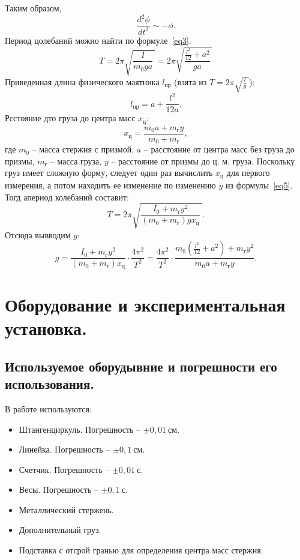 \documentclass[a4paper,11pt]{article}
\begin{document}
Таким образом,
$$\frac{d^{2}\phi}{dt^{2}} \sim - \phi.$$
Период цолебаний можно найти по формуле~\ref{eq3}.
\begin{equation}    \label{eq3}
  T = 2 \pi \sqrt{\frac{I}{m_{0}ga}\ } = 2 \pi \sqrt{\frac{\frac{l^{2}}{12} + a^{2}}{ga}\ }
\end{equation}
Приведенная длина физического маятника $l_{пр}$ (взята из $T = 2 \pi \sqrt{\frac{l}{g}\ }$):
\begin{equation}    \label{eq4}
  l_{пр} = a + \frac{l^{2}}{12a}.
\end{equation}
Рсстояние дто груза до центра масс $x_{ц}$:
\begin{equation}    \label{eq5}
  x_{ц} = \frac{m_{0}a + m_{г}y}{m_{0} + m_{г}},
\end{equation}
где $m_{0}$ -- масса стержня с призмой, $a$ -- расстояние от центра масс без груза до призмы, $m_{г}$ -- масса груза, $y$ -- расстояние от призмы до ц. м. груза.\newline
Поскольку груз имеет сложную форму, следует один раз вычислить $x_{ц}$ для первого измерения, а потом находить ее изменение по изменению $y$ из формулы~\ref{eq5}. Тогд апериод колебаний составит:
\begin{equation}    \label{eq6}
  T = 2 \pi \sqrt{\frac{I_{0} + m_{г} y^{2}}{(m_{0} + m_{г}) g x_{ц}}\ }.
\end{equation}
Отсюда вывводим $g$:
\begin{equation}    \label{eq7}
  g = \frac{I_{0} + m_{г}y^{2}}{(m_{0} + m_{г}) x_{ц}} \cdot \frac{4 \pi^{2}}{T^{2}} = \frac{4 \pi^{2}}{T^{2}} \cdot \frac{m_{0}(\frac{l^{2}}{12} + a^{2}) + m_{г} y^{2}}{m_{0}a + m_{г}y}.
\end{equation}
\section{Оборудование и экспериментальная установка.}
\subsection{Используемое оборудывние и погрешности его использования.}
В работе используются:
\begin{itemize}
        \item Штангенциркуль. Погрешность -- $\pm 0,01\ см$.
        \item Линейка. Погрешность -- $\pm 0,1\ см$.
        \item Счетчик. Погрешность -- $\pm 0,01\ с$.
        \item Весы. Погрешность -- $\pm 0,1\ с$.
        \item Металлический стержень.
        \item Дополнительный груз.
        \item Подставка с отсрой гранью для определения центра масс стержня.
\end{itemize}
\end{document}

